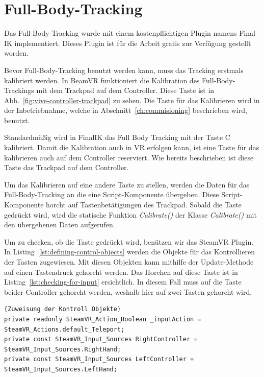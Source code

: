 \section{Full-Body-Tracking}
\label{sec:full-body-tracking}

Das Full-Body-Tracking wurde mit einem kostenpflichtigen Plugin namens Final IK implementiert.
Dieses Plugin ist für die Arbeit gratis zur Verfügung gestellt worden.

Bevor Full-Body-Tracking benutzt werden kann, muss das Tracking erstmals kalibriert werden.
In BeamVR funktioniert die Kalibration des Full-Body-Trackings mit dem Trackpad auf dem Controller.
Diese Taste ist in Abb.~\ref{fig:vive-controller-trackpad} zu sehen.
Die Taste für das Kalibrieren wird in der Inbetriebnahme, welche in Abschnitt~\ref{ch:commisioning} beschrieben wird, benutzt.

Standardmäßig wird in FinalIK das Full Body Tracking mit der Taste C kalibriert.
Damit die Kalibration auch in VR erfolgen kann, ist eine Taste für das kalibrieren auch auf dem Controller reserviert.
Wie bereits beschrieben ist diese Taste das Trackpad auf dem Controller.

Um das Kalibrieren auf eine andere Taste zu stellen, werden die Daten für das Full-Body-Tracking an die eine Script-Komponente übergeben.
Diese Script-Komponente horcht auf Tastenbetätigungen des Trackpad.
Sobald die Taste gedrückt wird, wird die statische Funktion \emph{Calibrate()} der Klasse \emph{Calibrate()} mit den übergebenen Daten aufgerufen.

Um zu checken, ob die Taste gedrückt wird, benützen wir das SteamVR Plugin.
In Listing~\ref{lst:defining-control-objects} werden die Objekte für das Kontrollieren der Tasten zugewiesen.
Mit diesen Objekten kann mithilfe der Update-Methode auf einen Tastendruck gehorcht werden.
Das Horchen auf diese Taste ist in Listing~\ref{lst:checking-for-input} ersichtlich.
In diesem Fall muss auf die Taste beider Controller gehorcht werden, weshalb hier auf zwei Tasten gehorcht wird.

\begin{lstlisting}[language={[Sharp]C},label={lst:defining-control-objects}, caption={Zuweisung der Kontroll Objekt}]{Zuweisung der Kontroll Objekte}
private readonly SteamVR_Action_Boolean _inputAction = SteamVR_Actions.default_Teleport;
private const SteamVR_Input_Sources RightController = SteamVR_Input_Sources.RightHand;
private const SteamVR_Input_Sources LeftController = SteamVR_Input_Sources.LeftHand;
\end{lstlisting}

